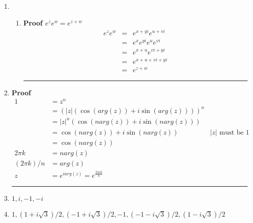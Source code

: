 \documentclass{article}%
\newcommand\abs[1]{\left|#1\right|}
\newenvironment{proof}[1][]{\begin{samepage}\textbf{Proof #1} }{\rule{0.5em}{0.5em} \end{samepage}}
\begin{document}
\begin{enumerate}
\begin{enumerate}[label*=\arabic*.]
\begin{enumerate}[label=\alph*]
\begin{proof}[$e^{i\theta}e^{i\phi}=e^{i(\theta+\phi)}$]
\begin{eqnarray*}
                                         &=& e^{i(\theta+\phi)}
                \end{eqnarray*}
            \end{proof}
        \end{enumerate}
        \item %
        \begin{enumerate}[label=\alph*]
            \item %
            \begin{proof}[$e^ze^w=e^{z+w}$]
                \begin{eqnarray*}
                    e^z e^w &=& e^{x+yi} e^{u+vi} \\
                            &=& e^x e^{yi} e^u e^{vi} \\ 
                            &=& e^{x + u} e^{vi + yi} \\
                            &=& e^{x + u + vi + yi} \\
                            &=& e^{z+w}
                \end{eqnarray*}
            \end{proof}
        \end{enumerate}
        \setcounter{enumii}{32}
        \item %
        \begin{proof}
            \begin{align*}
                1 &= z^n \\ 
                  &= (\abs{z} (\cos(arg(z)) + i \sin(arg(z))))^n \\
                  &= \abs{z}^n (\cos(n arg(z)) + i \sin(n arg(z))) \\
                  &= \cos(n arg(z)) + i \sin(n arg(z)) & \abs{z} \text{ must be 1} \\
                  &= \cos(n arg(z))\\
          2 \pi k &= n arg(z) \\
          (2\pi k)/n &= arg(z) \\
                z &= e^{i arg(z)} = e^{\frac{2 \pi i k}{n}}
            \end{align*}
        \end{proof}
        \item %
            $1, i, -1, -i$
        \item %
            $1, (1+i\sqrt{3})/2, (-1+i\sqrt{3})/2, -1,  (-1-i\sqrt{3})/2, (1-i\sqrt{3})/2$
    \end{enumerate}
\end{enumerate}
\end{document}
